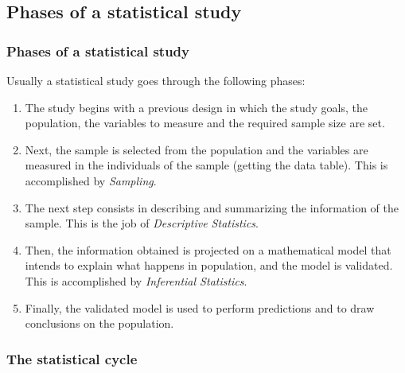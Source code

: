 \subsection{Phases of a statistical study}

\begin{frame}
\frametitle{Phases of a statistical study}
Usually a statistical study goes through the following phases:
\begin{enumerate}
\item The study begins with a previous design in which the study goals, the population, the variables to measure and the required sample size are set.
\item Next, the sample is selected from the population and the variables are measured in the individuals of the sample (getting the data table).
This is accomplished by \emph{Sampling}.
\item The next step consists in describing and summarizing the information of the sample.
This is the job of \emph{Descriptive Statistics}.
\item Then, the information obtained is projected on a mathematical model that intends to explain what happens in population, and the model is validated.
This is accomplished by \emph{Inferential Statistics}.
\item Finally, the validated model is used to perform predictions and to draw conclusions on the population.
\end{enumerate}
\end{frame}


\begin{frame}
\frametitle{The statistical cycle}
\begin{center}
\resizebox{0.85\textwidth}{!}{}
\end{center}
\end{frame}
